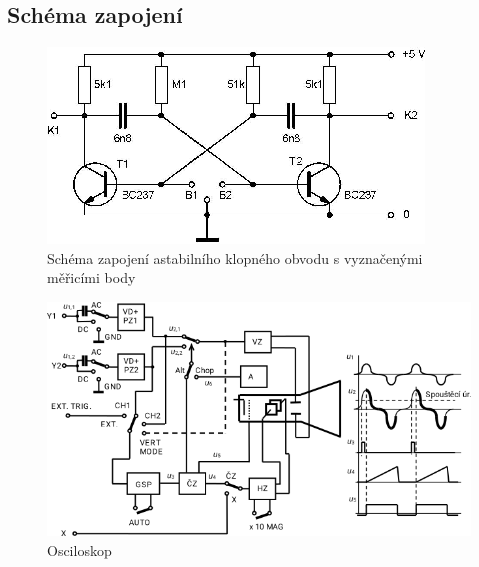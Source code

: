 \documentclass[5pt]{article}
\begin{document}
\begin{enumerate}
\section{Schéma zapojení}
\begin{figure}[htp]
\centering
\includegraphics[scale=1.00]{scheme.png}
\caption{Schéma zapojení astabilního klopného obvodu s vyznačenými měřicími body}
\end{figure}
\begin{figure}[htp]
\centering
\includegraphics[scale=0.8]{block.png}
\caption{Osciloskop}
\end{figure}
\end{enumerate}
\end{document}
